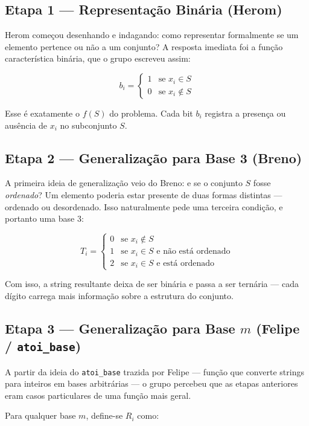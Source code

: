 \documentclass[12pt, a4paper]{article}
\begin{document}
\subsection{Etapa 1 --- Representação Binária (Herom)}

Herom começou desenhando e indagando: como representar formalmente se um elemento pertence ou não a um conjunto? A resposta imediata foi a função característica binária, que o grupo escreveu assim:

$$
b_i = \begin{cases} 1 & \text{se } x_i \in S \\ 0 & \text{se } x_i \notin S \end{cases}
$$

Esse é exatamente o $f(S)$ do problema. Cada bit $b_i$ registra a presença ou ausência de $x_i$ no subconjunto $S$.

\subsection{Etapa 2 --- Generalização para Base 3 (Breno)}

A primeira ideia de generalização veio do Breno: e se o conjunto $S$ fosse \textit{ordenado}? Um elemento poderia estar presente de duas formas distintas --- ordenado ou desordenado. Isso naturalmente pede uma terceira condição, e portanto uma base 3:

$$
T_i = \begin{cases} 0 & \text{se } x_i \notin S \\ 1 & \text{se } x_i \in S \text{ e não está ordenado} \\ 2 & \text{se } x_i \in S \text{ e está ordenado } \end{cases}
$$

Com isso, a string resultante deixa de ser binária e passa a ser ternária --- cada dígito carrega mais informação sobre a estrutura do conjunto.

\subsection{Etapa 3 --- Generalização para Base $m$ (Felipe / \texttt{atoi\_base})}

A partir da ideia do \texttt{atoi\_base} trazida por Felipe --- função que converte strings para inteiros em bases arbitrárias --- o grupo percebeu que as etapas anteriores eram casos particulares de uma função mais geral.

Para qualquer base $m$, define-se $R_i$ como:
\end{document}
